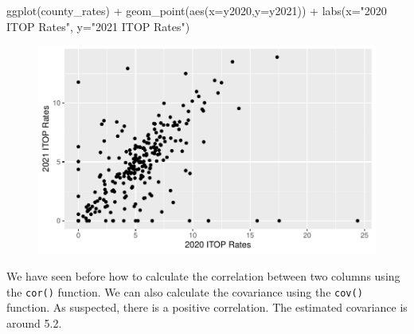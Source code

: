 \documentclass[
  letterpaper,
]{krantz}
\makeatletter
\newenvironment{Shaded}{\begin{snugshade}}{\end{snugshade}}
\newcommand{\AttributeTok}[1]{\textcolor[rgb]{0.40,0.45,0.13}{#1}}
\newcommand{\CommentTok}[1]{\textcolor[rgb]{0.37,0.37,0.37}{#1}}
\newcommand{\FunctionTok}[1]{\textcolor[rgb]{0.28,0.35,0.67}{#1}}
\newcommand{\NormalTok}[1]{\textcolor[rgb]{0.00,0.23,0.31}{#1}}
\newcommand{\SpecialCharTok}[1]{\textcolor[rgb]{0.37,0.37,0.37}{#1}}
\newcommand{\StringTok}[1]{\textcolor[rgb]{0.13,0.47,0.30}{#1}}
\newenvironment{kframe}{%
\medskip{}
\setlength{\fboxsep}{.8em}
 \def\at@end@of@kframe{}%
 \ifinner\ifhmode%
  \def\at@end@of@kframe{\end{minipage}}%
  \begin{minipage}{\columnwidth}%
 \fi\fi%
 \def\FrameCommand##1{\hskip\@totalleftmargin \hskip-\fboxsep
 \colorbox{shadecolor}{##1}\hskip-\fboxsep
     \hskip-\linewidth \hskip-\@totalleftmargin \hskip\columnwidth}%
 \MakeFramed {\advance\hsize-\width
   \@totalleftmargin\z@ \linewidth\hsize
   \@setminipage}}%
 {\par\unskip\endMakeFramed%
 \at@end@of@kframe}
\renewenvironment{Shaded}{\begin{kframe}}{\end{kframe}}
\makeatother
\begin{document}
\begin{Shaded}
\begin{Highlighting}[]
\FunctionTok{ggplot}\NormalTok{(county\_rates) }\SpecialCharTok{+} 
 \FunctionTok{geom\_point}\NormalTok{(}\FunctionTok{aes}\NormalTok{(}\AttributeTok{x=}\NormalTok{y2020,}\AttributeTok{y=}\NormalTok{y2021)) }\SpecialCharTok{+}
 \FunctionTok{labs}\NormalTok{(}\AttributeTok{x=}\StringTok{"2020 ITOP Rates"}\NormalTok{, }\AttributeTok{y=}\StringTok{"2021 ITOP Rates"}\NormalTok{)}
\end{Highlighting}
\end{Shaded}

\begin{figure}[H]

{\centering \includegraphics[width=1\textwidth,height=\textheight]{book/9_hypothesis_tests_files/figure-pdf/unnamed-chunk-13-1.pdf}

}

\end{figure}

We have seen before how to calculate the correlation between two columns
using the \texttt{cor()} function. We can also calculate the covariance
using the \texttt{cov()} function. As suspected, there is a positive
correlation. The estimated covariance is around 5.2.

\begin{Shaded}
\end{Shaded}
\end{document}
